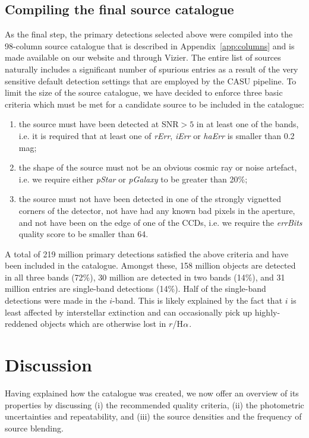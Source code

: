 \documentclass[useAMS,usenatbib]{mn2e}
\def\ha{\mbox{H$\rm \alpha$}}
\begin{document}
\subsection{Compiling the final source catalogue}

As the final step, the primary detections
selected above were compiled
into the 98-column source catalogue
that is described in Appendix~\ref{app:columns}
and is made available on our website and through Vizier.
The entire list of sources naturally includes 
a significant number of spurious entries
as a result of the very sensitive default detection settings
that are employed by the CASU pipeline.
To limit the size of the source catalogue,
we have decided to enforce three basic criteria
which must be met for a candidate source
to be included in the catalogue:
\begin{enumerate}
\item the source must have been detected at SNR$>5$ in at least
one of the bands, i.e. it is required that at least one of
\emph{rErr}, \emph{iErr} or \emph{haErr} is smaller
than 0.2 mag;
\item the shape of the source must not be an obvious
cosmic ray or noise artefact, i.e. we require
either \emph{pStar} or \emph{pGalaxy} to be
greater than 20\%;
\item the source must not have been detected in one of the strongly
vignetted corners of the detector, 
not have had any known bad pixels in the aperture,
and not have been on the edge of one of the CCDs,
i.e. we require the \emph{errBits} quality score
to be smaller than 64.
\end{enumerate}

A total of 219 million primary detections satisfied
the above criteria and have been included in the catalogue.
Amongst these, 158 million objects 
are detected in all three bands (72\%),
30 million are detected in two bands (14\%),
and 31 million entries are single-band detections (14\%).
Half of the single-band detections were made in the $i$-band.
This is likely explained by the fact that $i$ is least
affected by interstellar extinction and can occasionally pick up
highly-reddened objects which are otherwise lost in $r$/\ha.

\section{Discussion}
\label{sec:discussion}

Having explained how the catalogue was created,
we now offer an overview of its properties
by discussing  
(i) the recommended quality criteria,
(ii) the photometric uncertainties and repeatability,
and (iii) the source densities and the frequency of source blending.
\end{document}
